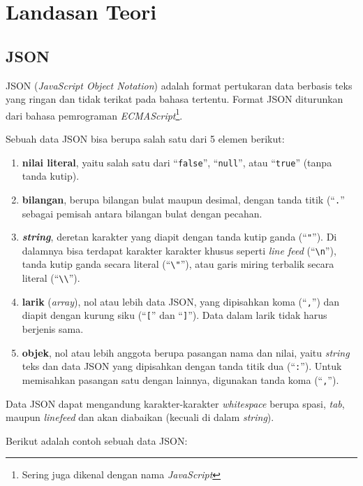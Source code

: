 \chapter{Landasan Teori}

\section{JSON}

JSON (\textit{JavaScript Object Notation}) adalah format pertukaran data berbasis teks yang ringan dan tidak terikat pada bahasa tertentu\cite{rfc7159}. Format JSON diturunkan dari bahasa pemrograman \textit{ECMAScript}\footnote{Sering juga dikenal dengan nama \textit{JavaScript}}.

Sebuah data JSON bisa berupa salah satu dari 5 elemen berikut:

\begin{enumerate}
	\item \textbf{nilai literal}, yaitu salah satu dari ``\texttt{false}'', ``\texttt{null}'', atau ``\texttt{true}'' (tanpa tanda kutip).
	\item \textbf{bilangan}, berupa bilangan bulat maupun desimal, dengan tanda titik (``\texttt{.}'' sebagai pemisah antara bilangan bulat dengan pecahan.
	\item \textbf{\textit{string}}, deretan karakter yang diapit dengan tanda kutip ganda (``\verb/"/''). Di dalamnya bisa terdapat karakter karakter khusus seperti \textit{line feed} (``\verb/\n/''), tanda kutip ganda secara literal (``\verb/\"/''), atau garis miring terbalik secara literal (``\verb/\\/'').
	\item \textbf{larik} (\textit{array}), nol atau lebih data JSON, yang dipisahkan koma (``\verb/,/'') dan diapit dengan kurung siku (``\verb/[/'' dan ``\verb/]/''). Data dalam larik tidak harus berjenis sama.
	\item \textbf{objek}, nol atau lebih anggota berupa pasangan nama dan nilai, yaitu \textit{string} teks dan data JSON yang dipisahkan dengan tanda titik dua (``\verb/:/''). Untuk memisahkan pasangan satu dengan lainnya, digunakan tanda koma (``\verb/,/'').
\end{enumerate}

Data JSON dapat mengandung karakter-karakter \textit{whitespace} berupa spasi, \textit{tab}, maupun \textit{linefeed} dan akan diabaikan (kecuali di dalam \textit{string}).

Berikut adalah contoh sebuah data JSON:

